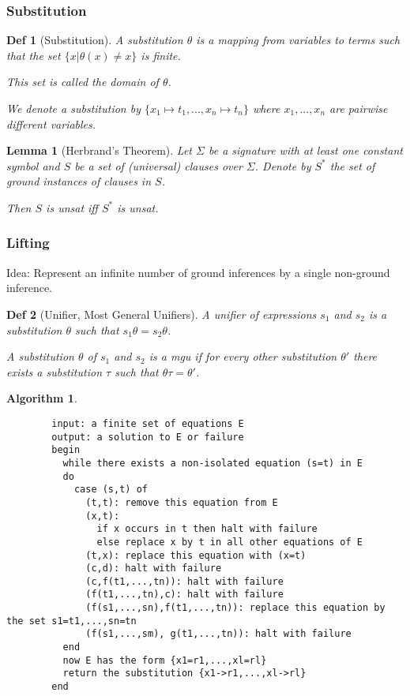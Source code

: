 \documentclass[]{article}
\newtheorem{lemma}{Lemma}
\newtheorem*{definition*}{Def}
\newtheorem{algorithm}{Algorithm}
\begin{document}
\subsubsection{Substitution}

\begin{definition*}[Substitution]
	A substitution $\theta$ is a mapping from variables to terms such that the set $\{x | \theta(x) \not= x\}$ is finite.
	
	This set is called the domain of $\theta$.
	
	We denote a substitution by $\{x_1 \mapsto t_1, ..., x_n \mapsto t_n\}$ where $x_1,...,x_n$ are pairwise different variables.
\end{definition*}

\begin{lemma}[Herbrand's Theorem]
	Let $\Sigma$ be a signature with at least one constant symbol and $S$ be a set of (universal) clauses over $\Sigma$. Denote by $S^*$ the set of ground instances of clauses in $S$.
	
	Then $S$ is unsat iff $S^*$ is unsat.
\end{lemma}

\subsubsection{Lifting}

Idea: Represent an infinite number of ground inferences by a single non-ground inference.

\begin{definition*}[Unifier, Most General Unifiers]
	A unifier of expressions $s_1$ and $s_2$ is a substitution $\theta$ such that $s_1\theta = s_2\theta$.
	
	A substitution $\theta$ of $s_1$ and $s_2$ is a mgu if for every other substitution $\theta'$ there exists a substitution $\tau$ such that $\theta\tau = \theta'$.
\end{definition*}

\begin{algorithm}
	\begin{verbatim}
		input: a finite set of equations E
		output: a solution to E or failure
		begin
		  while there exists a non-isolated equation (s=t) in E
		  do
		    case (s,t) of
		      (t,t): remove this equation from E
		      (x,t):
		        if x occurs in t then halt with failure
		        else replace x by t in all other equations of E
		      (t,x): replace this equation with (x=t)
		      (c,d): halt with failure
		      (c,f(t1,...,tn)): halt with failure
		      (f(t1,...,tn),c): halt with failure
		      (f(s1,...,sn),f(t1,...,tn)): replace this equation by the set s1=t1,...,sn=tn
		      (f(s1,...,sm), g(t1,...,tn)): halt with failure
		  end
		  now E has the form {x1=r1,...,xl=rl}
		  return the substitution {x1->r1,...,xl->rl}
		end
	\end{verbatim}
\end{algorithm}
\end{document}
